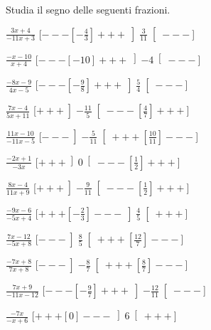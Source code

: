 \begin{esercizio}\label{ese:dis_7}
 Studia il segno delle seguenti frazioni.
\begin{multicols}{2}
 \begin{enumeratea}
  \item  $\frac{3 x +4}{-11 x +3}$ \hfill 
  [$---\left [-\frac{4}{3} \right ]+++\left ]\frac{3}{11} \right [---$]
  \item  $\frac{- x -10}{x +4}$ \hfill 
  [$---\left [-10 \right ]+++\left ]-4 \right [---$]
  \item  $\frac{-8 x -9}{4 x -5}$ \hfill 
  [$---\left [-\frac{9}{8} \right ]+++\left ]\frac{5}{4} \right [---$]
  \item  $\frac{7 x -4}{5 x +11}$ \hfill 
  [$+++\left ]-\frac{11}{5} \right [---\left [\frac{4}{7} \right ]+++$]
  \item  $\frac{11 x -10}{-11 x -5}$ \hfill 
  [$---\left ]-\frac{5}{11} \right [+++\left [\frac{10}{11} \right ]---$]
  \item  $\frac{-2 x +1}{-3 x }$ \hfill 
  [$+++\left ]0 \right [---\left [\frac{1}{2} \right ]+++$]
  \item  $\frac{8 x -4}{11 x +9}$ \hfill 
  [$+++\left ]-\frac{9}{11} \right [---\left [\frac{1}{2} \right ]+++$]
  \item  $\frac{-9 x -6}{-5 x +4}$ \hfill 
  [$+++\left [-\frac{2}{3} \right ]---\left ]\frac{4}{5} \right [+++$]
  \item  $\frac{7 x -12}{-5 x +8}$ \hfill 
  [$---\left ]\frac{8}{5} \right [+++\left [\frac{12}{7} \right ]---$]
  \item  $\frac{-7 x +8}{7 x +8}$ \hfill 
  [$---\left ]-\frac{8}{7} \right [+++\left [\frac{8}{7} \right ]---$]
  \item  $\frac{7 x +9}{-11 x -12}$ \hfill 
  [$---\left [-\frac{9}{7} \right ]+++\left ]-\frac{12}{11} \right [---$]
  \item  $\frac{-7 x }{- x +6}$ \hfill 
  [$+++\left [0 \right ]---\left ]6 \right [+++$]
 \end{enumeratea}
\end{multicols}
\end{esercizio}

